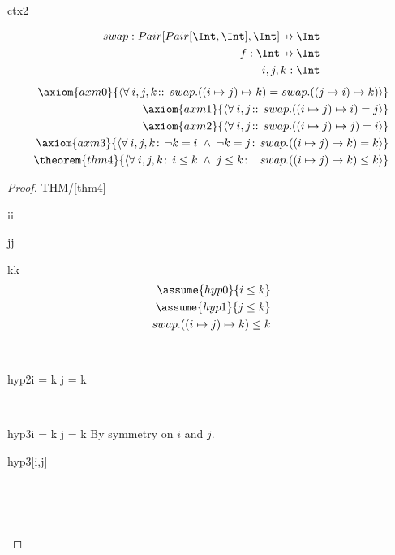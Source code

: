\documentclass[12pt]{amsart}
\begin{document}
\begin{context}{ctx2}

\begin{align*}
\constant{swap : Pair [Pair [ \Int, \Int ], \Int ] \pfun \Int } \\
\dummy{ f : \Int \pfun \Int } \\
\dummy{ i,j,k : \Int } 
\end{align*}
\begin{align*}
\axiom{axm0}{ \qforall{i,j,k}{}{ swap.((i \mapsto j) \mapsto k) = swap.((j \mapsto i) \mapsto k) } } \\
\axiom{axm1}{ \qforall{i,j}{}{ swap.((i \mapsto j) \mapsto i) = j } } \\
\axiom{axm2}{ \qforall{i,j}{}{ swap.((i \mapsto j) \mapsto j) = i } } \\
\axiom{axm3}{ \qforall{i,j,k}{\neg k = i \1\land \neg k = j}{ swap.((i \mapsto j) \mapsto k) = k } } \\
\theorem{thm4}{ \qforall{i,j,k}{i \le k \1\land j \le k}{  ~ ~ swap.((i \mapsto j) \mapsto k) \le k } } \\
\end{align*}

\begin{proof}{THM/\ref{thm4}}
\begin{free:var}{i}{i}
\begin{free:var}{j}{j}
\begin{free:var}{k}{k}
	\begin{align}
	\assume{hyp0}{i \le k} \\
	\assume{hyp1}{j \le k} \\
	\goal{ swap.((i \mapsto j) \mapsto k) \le k }
	\end{align}
	\noindent
	\begin{by:cases} \\
	\begin{case}{hyp2}{\neg i = k \land \neg j = k}
		\easy
	\end{case} \\
	\begin{case}{hyp3}{i = k \lor j = k}
		By symmetry on $i$ and $j$.
		\begin{by:symmetry}{hyp3}{[i,j]}
		\easy
		\end{by:symmetry} \\
	\noindent \end{case} \\
	\end{by:cases}
\end{free:var}
\end{free:var}
\end{free:var}
\end{proof}

\end{context}
\end{document}

